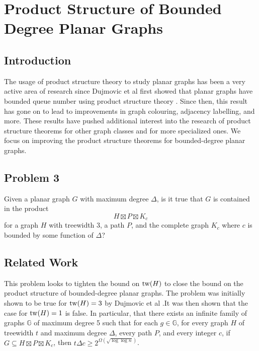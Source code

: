 \documentclass[../main.tex]{subfiles}
\begin{document}
	
	\section{Product Structure of Bounded Degree Planar Graphs}
	\subsection{Introduction}
	The usage of product structure theory to study planar graphs has been a very active area of research since Dujmovic et al first showed that planar graphs have bounded queue number using product structure theory \cite{DJMMUW20}. Since then, this result has gone on to lead to improvements in graph colouring\cite{DEJWW20}, adjacency labelling\cite{DEJGMM21,EJM23}, and more. 
	These results have pushed additional interest into the research of product structure theorems for other graph classes and for more specialized ones. We focus on improving the product structure theorems for bounded-degree planar graphs.
	
	\subsection{Problem 3}
	Given a planar graph $G$ with maximum degree $\Delta$, is it true that $G$ is contained in the product $$H\boxtimes P\boxtimes K_c$$ for a graph $H$ with treewidth 3, a path $P$, and the complete graph $K_c$ where $c$ is bounded by some function of $\Delta$?
	
	\subsection{Related Work}
	This problem looks to tighten the bound on $\operatorname{tw}(H)$ to close the bound on the product structure of bounded-degree planar graphs. The problem was initially shown to be true for $\operatorname{tw}(H)=3$ by Dujmovic et al \cite{DJMMUW20}.It was then shown that the case for $\operatorname{tw}(H)=1$ is false\cite{DJMMW24}. 
	In particular, that there exists an infinite family of graphs $\mathbb{G}$ of maximum degree 5 such that for each $g\in\mathbb{G}$, for every graph $H$ of treewidth $t$ and maximum degree $\Delta$, every path $P$, and every integer $c$, if $G\subseteq H \boxtimes P\boxtimes K_c$, then $t\Delta c\ge 2^{\Omega(\sqrt{\log\log n})}$.
	
	
	
	
\end{document}
